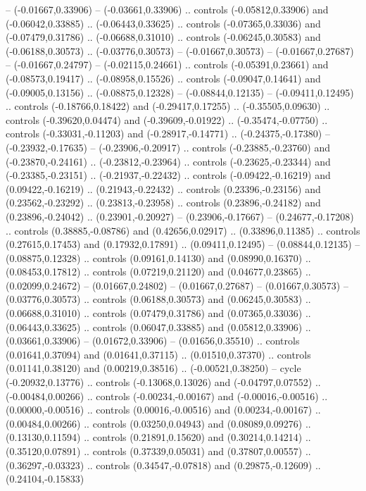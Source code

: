 {{-- (-0.01667,0.33906)
-- (-0.03661,0.33906)
.. controls (-0.05812,0.33906) and (-0.06042,0.33885) .. (-0.06443,0.33625)
.. controls (-0.07365,0.33036) and (-0.07479,0.31786) .. (-0.06688,0.31010)
.. controls (-0.06245,0.30583) and (-0.06188,0.30573) .. (-0.03776,0.30573)
-- (-0.01667,0.30573)
-- (-0.01667,0.27687)
-- (-0.01667,0.24797)
-- (-0.02115,0.24661)
.. controls (-0.05391,0.23661) and (-0.08573,0.19417) .. (-0.08958,0.15526)
.. controls (-0.09047,0.14641) and (-0.09005,0.13156) .. (-0.08875,0.12328)
-- (-0.08844,0.12135)
-- (-0.09411,0.12495)
.. controls (-0.18766,0.18422) and (-0.29417,0.17255) .. (-0.35505,0.09630)
.. controls (-0.39620,0.04474) and (-0.39609,-0.01922) .. (-0.35474,-0.07750)
.. controls (-0.33031,-0.11203) and (-0.28917,-0.14771) .. (-0.24375,-0.17380)
-- (-0.23932,-0.17635)
-- (-0.23906,-0.20917)
.. controls (-0.23885,-0.23760) and (-0.23870,-0.24161) .. (-0.23812,-0.23964)
.. controls (-0.23625,-0.23344) and (-0.23385,-0.23151) .. (-0.21937,-0.22432)
.. controls (-0.09422,-0.16219) and (0.09422,-0.16219) .. (0.21943,-0.22432)
.. controls (0.23396,-0.23156) and (0.23562,-0.23292) .. (0.23813,-0.23958)
.. controls (0.23896,-0.24182) and (0.23896,-0.24042) .. (0.23901,-0.20927)
-- (0.23906,-0.17667)
-- (0.24677,-0.17208)
.. controls (0.38885,-0.08786) and (0.42656,0.02917) .. (0.33896,0.11385)
.. controls (0.27615,0.17453) and (0.17932,0.17891) .. (0.09411,0.12495)
-- (0.08844,0.12135)
-- (0.08875,0.12328)
.. controls (0.09161,0.14130) and (0.08990,0.16370) .. (0.08453,0.17812)
.. controls (0.07219,0.21120) and (0.04677,0.23865) .. (0.02099,0.24672)
-- (0.01667,0.24802)
-- (0.01667,0.27687)
-- (0.01667,0.30573)
-- (0.03776,0.30573)
.. controls (0.06188,0.30573) and (0.06245,0.30583) .. (0.06688,0.31010)
.. controls (0.07479,0.31786) and (0.07365,0.33036) .. (0.06443,0.33625)
.. controls (0.06047,0.33885) and (0.05812,0.33906) .. (0.03661,0.33906)
-- (0.01672,0.33906)
-- (0.01656,0.35510)
.. controls (0.01641,0.37094) and (0.01641,0.37115) .. (0.01510,0.37370)
.. controls (0.01141,0.38120) and (0.00219,0.38516) .. (-0.00521,0.38250)
-- cycle
(-0.20932,0.13776)
.. controls (-0.13068,0.13026) and (-0.04797,0.07552) .. (-0.00484,0.00266)
.. controls (-0.00234,-0.00167) and (-0.00016,-0.00516) .. (0.00000,-0.00516)
.. controls (0.00016,-0.00516) and (0.00234,-0.00167) .. (0.00484,0.00266)
.. controls (0.03250,0.04943) and (0.08089,0.09276) .. (0.13130,0.11594)
.. controls (0.21891,0.15620) and (0.30214,0.14214) .. (0.35120,0.07891)
.. controls (0.37339,0.05031) and (0.37807,0.00557) .. (0.36297,-0.03323)
.. controls (0.34547,-0.07818) and (0.29875,-0.12609) .. (0.24104,-0.15833)
}}
